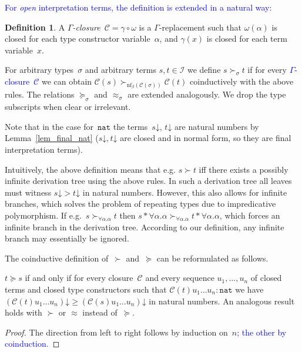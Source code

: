 \documentclass[a4paper,UKenglish,cleveref,autoref,numberwithinsect]{lipics-v2019}
\theoremstyle{definition}
\newtheorem{defn}[theorem]{Definition}
\newcommand{\Iterms}{\mathcal{I}}
\newcommand{\tapp}[2]{#1 * #2}
\newcommand{\nat}{\mathtt{nat}}
\newcommand{\cl}{\mathcal{C}}
\newcommand{\nf}{\mathrm{nf}}
\newcommand{\da}{\mathord{\downarrow}}
\newcommand{\CKchange}[1]{\textcolor{blue}{#1}}
\begin{document}
\CKchange{For \emph{open} interpretation terms, the definition is
extended in a natural way:}

\begin{defn}\label{def_closure}
  A \emph{$\Gamma$-closure}~$\cl = \gamma \circ \omega$ is a
  $\Gamma$-replacement such that $\omega(\alpha)$ is closed for each
  type constructor variable~$\alpha$, and $\gamma(x)$ is closed for
  each term variable~$x$.

  For arbitrary types~$\sigma$ and arbitrary terms $s,t \in \Iterms$
  we define $s \succ_\sigma t$ if for every \CKchange{$\Gamma$-closure~$\cl$} we can
  obtain $\cl(s) \succ_{\nf_\beta(\cl(\sigma))} \cl(t)$ coinductively
  with the above rules. The relations $\succeq_\sigma$ and
  $\approx_\sigma$ are extended analogously. We drop the type
  subscripts when clear or irrelevant.
\end{defn}

Note that in the case for~$\nat$ the terms~$s\da$, $t\da$ are natural
numbers by Lemma~\ref{lem_final_nat} ($s\da,t\da$ are closed and in
normal form, so they are final interpretation terms).

Intuitively, the above definition means that e.g. $s \succ t$ iff
there exists a possibly infinite derivation tree using the above
rules. In such a derivation tree all leaves must witness $s\da > t\da$
in natural numbers. However, this also allows for infinite branches,
which solves the problem of repeating types due to impredicative
polymorphism. If e.g.~$s \succ_{\forall \alpha . \alpha} t$ then
$\tapp{s}{\forall\alpha.\alpha} \succ_{\forall \alpha . \alpha}
\tapp{t}{\forall\alpha.\alpha}$, which forces an infinite branch in
the derivation tree. According to our definition, any infinite branch
may essentially be ignored.

The coinductive definition of~$\succ$ and~$\succeq$ can be
reformulated as follows.

\begin{lemma}
  $t \succeq s$ if and only if for every closure~$\cl$ and every
  sequence $u_1,\ldots,u_n$ of closed terms and closed type
  constructors such that $\cl(t) u_1 \ldots u_n : \nat$ we have
  $(\cl(t) u_1 \ldots u_n)\da \ge (\cl(s) u_1 \ldots u_n)\da$ in
  natural numbers. An analogous result holds with $\succ$ or $\approx$
  instead of~$\succeq$.
\end{lemma}

\begin{proof}
  The direction from left to right follows by induction on~$n$\CKchange{;
  the other by coinduction.}
\end{proof}
\end{document}
